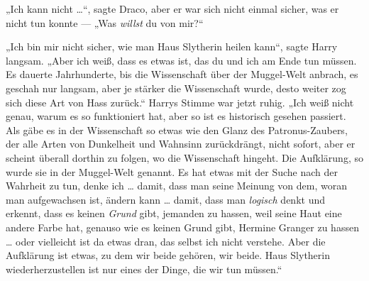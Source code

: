 „Ich kann nicht …“, sagte Draco, aber er war sich nicht einmal sicher, was er nicht tun konnte —
„Was \emph{willst} du von mir?“

„Ich bin mir nicht sicher, wie man Haus Slytherin heilen kann“, sagte Harry langsam.
„Aber ich weiß, dass es etwas ist, das du und ich am Ende tun müssen. Es dauerte Jahrhunderte, bis die Wissenschaft über der Muggel-Welt anbrach, es geschah nur langsam, aber je stärker die Wissenschaft wurde, desto weiter zog sich diese Art von Hass zurück.“ Harrys Stimme war jetzt ruhig.
„Ich weiß nicht genau, warum es so funktioniert hat, aber so ist es historisch gesehen passiert. Als gäbe es in der Wissenschaft so etwas wie den Glanz des Patronus-Zaubers, der alle Arten von Dunkelheit und Wahnsinn zurückdrängt, nicht sofort, aber er scheint überall dorthin zu folgen, wo die Wissenschaft hingeht. Die Aufklärung, so wurde sie in der Muggel-Welt genannt.%
Es hat etwas mit der Suche nach der Wahrheit zu tun, denke ich … damit, dass man seine Meinung von dem, woran man aufgewachsen ist, ändern kann … damit, dass man \emph{logisch} denkt und erkennt, dass es keinen \emph{Grund} gibt, jemanden zu hassen, weil seine Haut eine andere Farbe hat, genauso wie es keinen Grund gibt, Hermine Granger zu hassen … oder vielleicht ist da etwas dran, das selbst ich nicht verstehe. Aber die Aufklärung ist etwas, zu dem wir beide gehören, wir beide. Haus Slytherin wiederherzustellen ist nur eines der Dinge, die wir tun müssen.“

